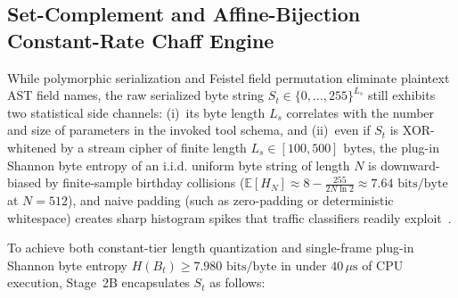 \documentclass[conference,10pt]{IEEEtran}
\begin{document}
\subsection{Set-Complement and Affine-Bijection Constant-Rate Chaff Engine}
While polymorphic serialization and Feistel field permutation eliminate plaintext AST field names, the raw serialized byte string $S_t \in \{0,\dots,255\}^{L_s}$ still exhibits two statistical side channels: (i)~its byte length $L_s$ correlates with the number and size of parameters in the invoked tool schema, and (ii)~even if $S_t$ is XOR-whitened by a stream cipher of finite length $L_s \in [100, 500]\text{ bytes}$, the plug-in Shannon byte entropy of an i.i.d. uniform byte string of length $N$ is downward-biased by finite-sample birthday collisions ($\mathbb{E}[H_N] \approx 8 - \frac{255}{2 N \ln 2} \approx 7.64\text{ bits/byte}$ at $N = 512$), and naive padding (such as zero-padding or deterministic whitespace) creates sharp histogram spikes that traffic classifiers readily exploit~\cite{dyer2012peekaboo}.

To achieve both constant-tier length quantization and single-frame plug-in Shannon byte entropy $H(B_t) \ge 7.980\text{ bits/byte}$ in under $40\,\mu\text{s}$ of CPU execution, Stage~2B encapsulates $S_t$ as follows:
\end{document}
